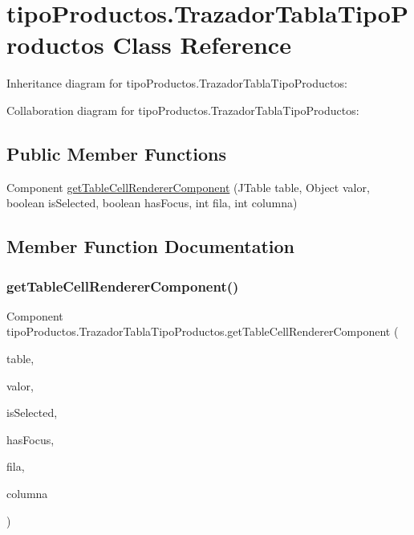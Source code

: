 \hypertarget{classtipo_productos_1_1_trazador_tabla_tipo_productos}{}\section{tipo\+Productos.\+Trazador\+Tabla\+Tipo\+Productos Class Reference}
\label{classtipo_productos_1_1_trazador_tabla_tipo_productos}


Inheritance diagram for tipo\+Productos.\+Trazador\+Tabla\+Tipo\+Productos\+:


Collaboration diagram for tipo\+Productos.\+Trazador\+Tabla\+Tipo\+Productos\+:
\subsection*{Public Member Functions}
\begin{DoxyCompactItemize}
\item 
Component \mbox{\hyperlink{classtipo_productos_1_1_trazador_tabla_tipo_productos_a21e09bccb69f0edb28992932c136d187}{get\+Table\+Cell\+Renderer\+Component}} (J\+Table table, Object valor, boolean is\+Selected, boolean has\+Focus, int fila, int columna)
\end{DoxyCompactItemize}


\subsection{Member Function Documentation}
\mbox{\label{classtipo_productos_1_1_trazador_tabla_tipo_productos_a21e09bccb69f0edb28992932c136d187}} 
\subsubsection{\texorpdfstring{get\+Table\+Cell\+Renderer\+Component()}{getTableCellRendererComponent()}}
{\footnotesize\ttfamily Component tipo\+Productos.\+Trazador\+Tabla\+Tipo\+Productos.\+get\+Table\+Cell\+Renderer\+Component (\begin{DoxyParamCaption}\item[{J\+Table}]{table,  }\item[{Object}]{valor,  }\item[{boolean}]{is\+Selected,  }\item[{boolean}]{has\+Focus,  }\item[{int}]{fila,  }\item[{int}]{columna }\end{DoxyParamCaption})\hspace{0.3cm}{\ttfamily [inline]}}


